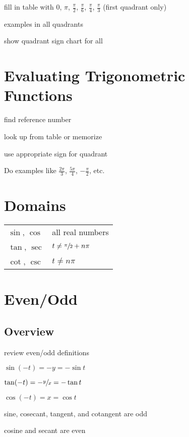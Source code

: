 \documentclass{exam}
\begin{document}
  \begin{itemize*}
    \item fill in table with 0, $\pi$, $\frac{\pi}{2}$, $\frac{\pi}{6}$, $\frac{\pi}{4}$, $\frac{\pi}{3}$ (first
      quadrant only)
    \item examples in all quadrants
    \item show quadrant sign chart for all
  \end{itemize*}

  \section{Evaluating Trigonometric Functions}

  \begin{itemize*}
    \item find reference number
    \item look up from table or memorize
    \item use appropriate sign for quadrant
  \end{itemize*}

  Do examples like $\frac{2 \pi}{3}$, $\frac{5 \pi}{4}$, $- \frac{\pi}{2}$, etc.

  \section{Domains}
  \begin{tabular}[H]{ll}
    $\sin$, $\cos$ & all real numbers \\
    $\tan$, $\sec$ & $t \neq \sfrac{\pi}{2} + n \pi$  \\
    $\cot$, $\csc$ & $t \neq n \pi$  \\
  \end{tabular}

  \section{Even/Odd}
  \subsection{Overview}
  \begin{itemize*}
    \item review even/odd definitions
    \item $\sin (-t) = -y = - \sin t$
    \item $\tan (-t) = - \sfrac{y}{x} = - \tan t$
    \item $\cos (-t) = x = \cos t$
    \item sine, cosecant, tangent, and cotangent are odd
    \item cosine and secant are even
  \end{itemize*}
\end{document}
